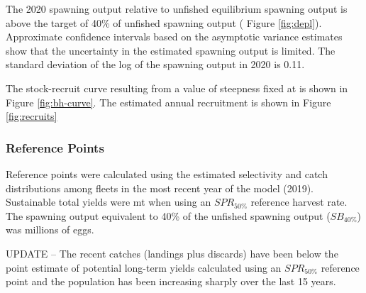 \documentclass[11pt,
  english,
  a4paper,
]{article}
\begin{document}
\leavevmode\tagmcend\tagstructend\par


The 2020 spawning output relative to unfished equilibrium spawning output is above the target of 40\% of unfished spawning output ( Figure \ref{fig:depl}). Approximate confidence intervals based on the asymptotic variance estimates show that the uncertainty in the estimated spawning output is limited. The standard deviation of the log of the spawning output in 2020 is 0.11.

\leavevmode\tagmcend\tagstructend\par


The stock-recruit curve resulting from a value of steepness fixed at is shown in Figure \ref{fig:bh-curve}. The estimated annual recruitment is shown in Figure \ref{fig:recruits}

\leavevmode\tagmcend\tagstructend\par


\hypertarget{reference-points}{%
\subsubsection{Reference Points}\label{reference-points}}

\leavevmode\tagmcend\tagstructend


Reference points were calculated using the estimated selectivity and catch distributions among fleets in the most recent year of the model (2019). Sustainable total yields were mt when using an {\(SPR_{50\%}\)\leavevmode\tagmcend\tagstructend} reference harvest rate. The spawning output equivalent to 40\% of the unfished spawning output ({\(SB_{40\%}\)\leavevmode\tagmcend\tagstructend}) was millions of eggs.

\leavevmode\tagmcend\tagstructend\par


UPDATE -- The recent catches (landings plus discards) have been below the point estimate of potential long-term yields calculated using an {\(SPR_{50\%}\)\leavevmode\tagmcend\tagstructend} reference point and the population has been increasing sharply over the last 15 years.
\end{document}
